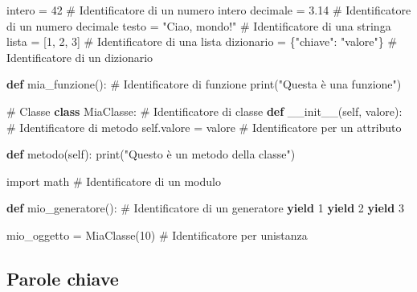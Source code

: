 \documentclass[
  letterpaper,
]{scrbook}
\newenvironment{Shaded}{\begin{snugshade}}{\end{snugshade}}
\newcommand{\BuiltInTok}[1]{\textcolor[rgb]{0.00,0.23,0.31}{#1}}
\newcommand{\CommentTok}[1]{\textcolor[rgb]{0.37,0.37,0.37}{#1}}
\newcommand{\ControlFlowTok}[1]{\textcolor[rgb]{0.00,0.23,0.31}{\textbf{#1}}}
\newcommand{\DecValTok}[1]{\textcolor[rgb]{0.68,0.00,0.00}{#1}}
\newcommand{\FloatTok}[1]{\textcolor[rgb]{0.68,0.00,0.00}{#1}}
\newcommand{\FunctionTok}[1]{\textcolor[rgb]{0.28,0.35,0.67}{#1}}
\newcommand{\ImportTok}[1]{\textcolor[rgb]{0.00,0.46,0.62}{#1}}
\newcommand{\KeywordTok}[1]{\textcolor[rgb]{0.00,0.23,0.31}{\textbf{#1}}}
\newcommand{\NormalTok}[1]{\textcolor[rgb]{0.00,0.23,0.31}{#1}}
\newcommand{\OperatorTok}[1]{\textcolor[rgb]{0.37,0.37,0.37}{#1}}
\newcommand{\StringTok}[1]{\textcolor[rgb]{0.13,0.47,0.30}{#1}}
\newcommand{\VariableTok}[1]{\textcolor[rgb]{0.07,0.07,0.07}{#1}}
\begin{document}
\begin{Shaded}
\begin{Highlighting}[]
\NormalTok{intero }\OperatorTok{=} \DecValTok{42}  \CommentTok{\# Identificatore di un numero intero}
\NormalTok{decimale }\OperatorTok{=} \FloatTok{3.14}  \CommentTok{\# Identificatore di un numero decimale}
\NormalTok{testo }\OperatorTok{=} \StringTok{"Ciao, mondo!"}  \CommentTok{\# Identificatore di una stringa}
\NormalTok{lista }\OperatorTok{=}\NormalTok{ [}\DecValTok{1}\NormalTok{, }\DecValTok{2}\NormalTok{, }\DecValTok{3}\NormalTok{]  }\CommentTok{\# Identificatore di una lista}
\NormalTok{dizionario }\OperatorTok{=}\NormalTok{ \{}\StringTok{"chiave"}\NormalTok{: }\StringTok{"valore"}\NormalTok{\}  }\CommentTok{\# Identificatore di un dizionario}

\KeywordTok{def}\NormalTok{ mia\_funzione(): }\CommentTok{\# Identificatore di funzione}
    \BuiltInTok{print}\NormalTok{(}\StringTok{"Questa è una funzione"}\NormalTok{)}

\CommentTok{\# Classe}
\KeywordTok{class}\NormalTok{ MiaClasse: }\CommentTok{\# Identificatore di classe}
    \KeywordTok{def} \FunctionTok{\_\_init\_\_}\NormalTok{(}\VariableTok{self}\NormalTok{, valore): }\CommentTok{\# Identificatore di metodo}
        \VariableTok{self}\NormalTok{.valore }\OperatorTok{=}\NormalTok{ valore  }\CommentTok{\# Identificatore per un attributo}
    
    \KeywordTok{def}\NormalTok{ metodo(}\VariableTok{self}\NormalTok{):}
        \BuiltInTok{print}\NormalTok{(}\StringTok{"Questo è un metodo della classe"}\NormalTok{)}

\ImportTok{import}\NormalTok{ math  }\CommentTok{\# Identificatore di un modulo}

\KeywordTok{def}\NormalTok{ mio\_generatore(): }\CommentTok{\# Identificatore di un generatore}
    \ControlFlowTok{yield} \DecValTok{1}
    \ControlFlowTok{yield} \DecValTok{2}
    \ControlFlowTok{yield} \DecValTok{3}

\NormalTok{mio\_oggetto }\OperatorTok{=}\NormalTok{ MiaClasse(}\DecValTok{10}\NormalTok{)  }\CommentTok{\# Identificatore per un\textquotesingle{}istanza}
\end{Highlighting}
\end{Shaded}

\subsection{Parole chiave}\label{parole-chiave}
\end{document}
